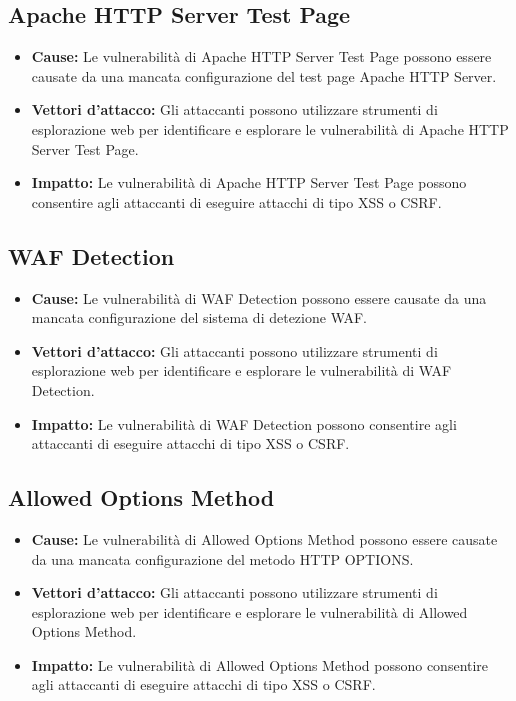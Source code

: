 \subsection{Apache HTTP Server Test Page}
\begin{itemize}
\item \textbf{Cause:} Le vulnerabilità di Apache HTTP Server Test Page possono essere causate da una mancata configurazione del test page Apache HTTP Server.
\item \textbf{Vettori d'attacco:} Gli attaccanti possono utilizzare strumenti di esplorazione web per identificare e esplorare le vulnerabilità di Apache HTTP Server Test Page.
\item \textbf{Impatto:} Le vulnerabilità di Apache HTTP Server Test Page possono consentire agli attaccanti di eseguire attacchi di tipo XSS o CSRF.
\end{itemize}
\subsection{WAF Detection}
\begin{itemize}
\item \textbf{Cause:} Le vulnerabilità di WAF Detection possono essere causate da una mancata configurazione del sistema di detezione WAF.
\item \textbf{Vettori d'attacco:} Gli attaccanti possono utilizzare strumenti di esplorazione web per identificare e esplorare le vulnerabilità di WAF Detection.
\item \textbf{Impatto:} Le vulnerabilità di WAF Detection possono consentire agli attaccanti di eseguire attacchi di tipo XSS o CSRF.
\end{itemize}
\subsection{Allowed Options Method}
\begin{itemize}
\item \textbf{Cause:} Le vulnerabilità di Allowed Options Method possono essere causate da una mancata configurazione del metodo HTTP OPTIONS.
\item \textbf{Vettori d'attacco:} Gli attaccanti possono utilizzare strumenti di esplorazione web per identificare e esplorare le vulnerabilità di Allowed Options Method.
\item \textbf{Impatto:} Le vulnerabilità di Allowed Options Method possono consentire agli attaccanti di eseguire attacchi di tipo XSS o CSRF.
\end{itemize}
